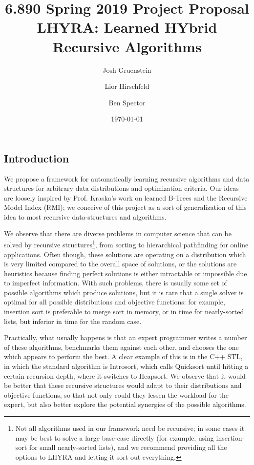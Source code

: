 \documentclass{article}
\title{6.890 Spring 2019 Project Proposal \\ LHYRA: Learned HYbrid Recursive Algorithms}
\author{Josh Gruenstein \and Lior Hirschfeld \and Ben Spector}
\date{\today}
\begin{document}
\maketitle

\subsection*{Introduction}

We propose a framework for automatically learning recursive algorithms and data structures for arbitrary data distributions and optimization criteria. Our ideas are loosely inspired by Prof. Kraska’s work on learned B-Trees and the Recursive Model Index (RMI); we conceive of this project as a sort of generalization of this idea to most recursive data-structures and algorithms.
	
We observe that there are diverse problems in computer science that can be solved by recursive structures\footnote{Not all algorithms used in our framework need be recursive; in some cases it may be best to solve a large base-case directly (for example, using insertion-sort for small nearly-sorted lists), and we recommend providing all the options to LHYRA and letting it sort out everything.}, from sorting to hierarchical pathfinding for online applications. Often though, these solutions are operating on a distribution which is very limited compared to the overall space of solutions, or the solutions are heuristics because finding perfect solutions is either intractable or impossible due to imperfect information. With such problems, there is usually some set of possible algorithms which produce solutions, but it is rare that a single solver is optimal for all possible distributions and objective functions: for example, insertion sort is preferable to merge sort in memory, or in time for nearly-sorted lists, but inferior in time for the random case.

Practically, what usually happens is that an expert programmer writes a number of these algorithms, benchmarks them against each other, and chooses the one which appears to perform the best. A clear example of this is in the C++ STL, in which the standard algorithm is Introsort, which calls Quicksort until hitting a certain recursion depth, where it switches to Heapsort. We observe that it would be better that these recursive structures would adapt to their distributions and objective functions, so that not only could they lessen the workload for the expert, but also better explore the potential synergies of the possible algorithms.
	
\end{document}

